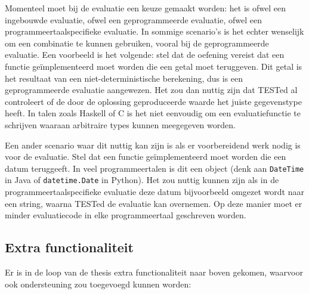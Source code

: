 Momenteel moet bij de evaluatie een keuze gemaakt worden: het is ofwel een ingebouwde evaluatie, ofwel een geprogrammeerde evaluatie, ofwel een programmeertaalspecifieke evaluatie.
In sommige scenario's is het echter wenselijk om een combinatie te kunnen gebruiken, vooral bij de geprogrammeerde evaluatie.
Een voorbeeld is het volgende: stel dat de oefening vereist dat een functie geïmplementeerd moet worden die een getal moet teruggeven.
Dit getal is het resultaat van een niet-deterministische berekening, dus is een geprogrammeerde evaluatie aangewezen.
Het zou dan nuttig zijn dat TESTed al controleert of de door de oplossing geproduceerde waarde het juiste gegevenstype heeft.
In talen zoals Haskell of C is het niet eenvoudig om een evaluatiefunctie te schrijven waaraan arbitraire types kunnen meegegeven worden.

Een ander scenario waar dit nuttig kan zijn is als er voorbereidend werk nodig is voor de evaluatie.
Stel dat een functie geïmplementeerd moet worden die een datum teruggeeft.
In veel programmeertalen is dit een object (denk aan \texttt{DateTime} in Java of \texttt{datetime.Date} in Python).
Het zou nuttig kunnen zijn als in de programmeertaalspecifieke evaluatie deze datum bijvoorbeeld omgezet wordt naar een string, waarna TESTed de evaluatie kan overnemen.
Op deze manier moet er minder evaluatiecode in elke programmeertaal geschreven worden.


\subsection{Extra functionaliteit}\label{subsec:kleinere-functies}

Er is in de loop van de thesis extra functionaliteit naar boven gekomen, waarvoor ook ondersteuning zou toegevoegd kunnen worden:


